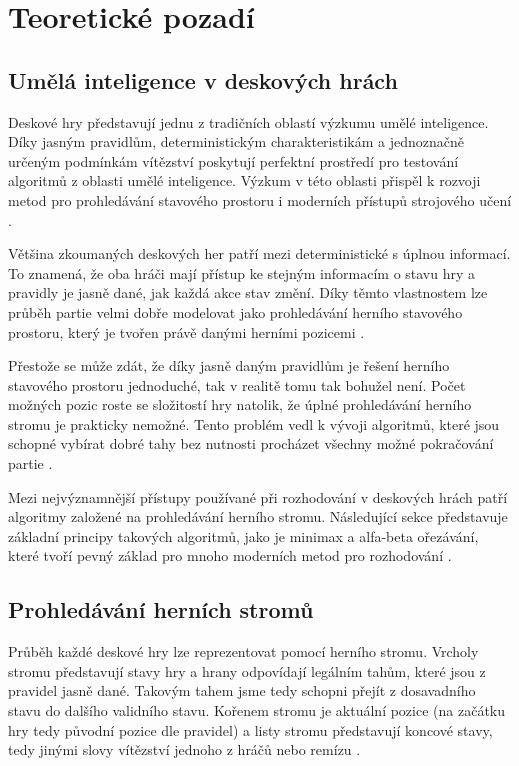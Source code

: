 \chapter{Teoretické pozadí}

\section{Umělá inteligence v deskových hrách}

Deskové hry představují jednu z tradičních oblastí výzkumu umělé inteligence. Díky jasným pravidlům, 
deterministickým charakteristikám a jednoznačně určeným podmínkám vítězství poskytují perfektní prostředí
pro testování algoritmů z oblasti umělé inteligence. Výzkum v této oblasti přispěl k rozvoji metod pro prohledávání
stavového prostoru i moderních přístupů strojového učení \cite{russell2021aima}.

Většina zkoumaných deskových her patří mezi deterministické s úplnou informací. To znamená, že oba hráči mají 
přístup ke stejným informacím o stavu hry a pravidly je jasně dané, jak každá akce stav změní. Díky těmto 
vlastnostem lze průběh partie velmi dobře modelovat jako prohledávání herního stavového prostoru, který 
je tvořen právě danými herními pozicemi \cite{russell2021aima}.

Přestože se může zdát, že díky jasně daným pravidlům je řešení herního stavového prostoru jednoduché, tak 
v realitě tomu tak bohužel není. Počet možných pozic roste se složitostí hry natolik, že úplné prohledávání
herního stromu je prakticky nemožné. Tento problém vedl k vývoji algoritmů, které jsou schopné vybírat dobré tahy
bez nutnosti procházet všechny možné pokračování partie \cite{russell2021aima,browne2012mcts}.

Mezi nejvýznamnější přístupy používané při rozhodování v deskových hrách patří algoritmy založené na prohledávání herního stromu.
Následující sekce představuje základní principy takových algoritmů, jako je minimax a alfa-beta ořezávání, které tvoří pevný
základ pro mnoho moderních metod pro rozhodování \cite{russell2021aima,browne2012mcts}.

\section{Prohledávání herních stromů}

Průběh každé deskové hry lze reprezentovat pomocí herního stromu. Vrcholy stromu představují stavy hry a hrany odpovídají 
legálním tahům, které jsou z pravidel jasně dané. Takovým tahem jsme tedy schopni přejít z dosavadního stavu do dalšího
validního stavu. Kořenem stromu je aktuální pozice (na začátku hry tedy původní pozice dle pravidel) a listy stromu představují
koncové stavy, tedy jinými slovy vítězství jednoho z hráčů nebo remízu \cite{russell2021aima}.

